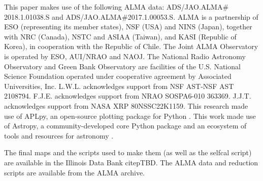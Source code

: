 \documentclass[linenumbers,twocolumn, twocolappendix]{aastex631}
\begin{document}
\begin{acknowledgments}
This paper makes use of the following ALMA data: ADS/JAO.ALMA$\#$2018.1.01038.S and ADS/JAO.ALMA$\#$2017.1.00053.S. ALMA is a partnership of ESO (representing its member states), NSF (USA) and NINS (Japan), together with NRC (Canada), NSTC and ASIAA (Taiwan), and KASI (Republic of Korea), in cooperation with the Republic of Chile. The Joint ALMA Observatory is operated by ESO, AUI/NRAO and NAOJ. The National Radio Astronomy Observatory and Green Bank Observatory are facilities of the U.S. National Science Foundation operated under cooperative agreement by Associated Universities, Inc. L.W.L. acknowledges support from NSF AST-NSF AST 2108794. F.J.E. acknowledges support from NRAO SOSPA6-010 363369. J.J.T. acknowledges support from  NASA XRP 80NSSC22K1159. This research made use of APLpy, an open-source plotting package for Python \citep{aplpy2012, aplpy2019}. This work made use of Astropy, a community-developed core Python package and an ecosystem of tools and resources for astronomy \citep{astropy:2013, astropy:2018, astropy:2022}.

The final maps and the scripts used to make them (as well as the selfcal script) are available in the Illinois Data Bank citep{TBD}. The ALMA data and reduction scripts are available from the ALMA archive.
\end{acknowledgments}

%
\end{document}
